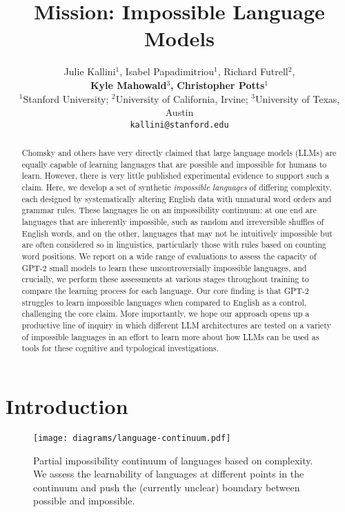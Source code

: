 \documentclass[11pt]{article}
\title{
Mission: Impossible Language Models
}
\author{Julie Kallini$^{1}$,
  Isabel Papadimitriou$^{1}$,
  Richard Futrell$^{2}$, \\
  \textbf{Kyle Mahowald}$^{3}$\textbf{,}
  \textbf{Christopher Potts}$^{1}$ \\[1ex]
  ${}^{1}$Stanford University; ${}^{2}$University of California, Irvine; ${}^{3}$University of Texas, Austin \\[1ex]
  \texttt{kallini@stanford.edu}
}
\begin{document}
\setlength{\Exlabelwidth}{1em}
\setlength{\Exlabelsep}{0.7em}
\setlength{\SubExleftmargin}{1.3em}
\setlength{\Extopsep}{2pt}

\maketitle

\begin{abstract}
Chomsky and others have very directly claimed that large language models (LLMs) are equally capable of learning languages that are possible and impossible for humans to learn. However, there is very little published experimental evidence to support such a claim. Here, we develop a set of synthetic \emph{impossible languages} of differing complexity, each designed by systematically altering English data with unnatural word orders and grammar rules. These languages lie on an impossibility continuum: at one end are languages that are inherently impossible, such as random and irreversible shuffles of English words, and on the other, languages that may not be intuitively impossible but are often considered so in linguistics, particularly those with rules based on counting word positions. We report on a wide range of evaluations to assess the capacity of GPT-2 small models to learn these uncontroversially impossible languages, and crucially, we perform these assessments at various stages throughout training to compare the learning process for each language. Our core finding is that GPT-2 struggles to learn impossible languages when compared to English as a control, challenging the core claim. More importantly, we hope our approach opens up a productive line of inquiry in which different LLM architectures are tested on a variety of impossible languages in an effort to learn more about how LLMs can be used as tools for these cognitive and typological investigations.
\end{abstract}

\section{Introduction}

\begin{figure}[ht]
    \centering
    \texttt{[image: diagrams/language-continuum.pdf]}
    \caption{Partial impossibility continuum of languages based on complexity. We assess the learnability of languages at different points in the continuum and push the (currently unclear) boundary between possible and impossible.}
    \label{fig:language-continuum}
\end{figure}
\end{document}
